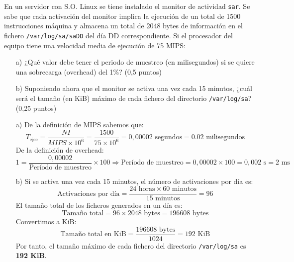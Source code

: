 \documentclass[a4paper,12pt]{article}
\begin{document}
\begin{tcolorbox}[colback=gray!10, colframe=black, title=3.- (0.75 puntos)]
En un servidor con S.O. Linux se tiene instalado el monitor de actividad \texttt{sar}. Se sabe que cada activación del monitor implica la ejecución de un total de 1500 instrucciones máquina y almacena un total de 2048 bytes de información en el fichero \texttt{/var/log/sa/saDD} del día DD correspondiente. Si el procesador del equipo tiene una velocidad media de ejecución de 75 MIPS:

\begin{enumerate}
    \item[a)] ¿Qué valor debe tener el periodo de muestreo (en milisegundos) si se quiere una sobrecarga (overhead) del 1\%? (0,5 puntos)
    \item[b)] Suponiendo ahora que el monitor se activa una vez cada 15 minutos, ¿cuál será el tamaño (en KiB) máximo de cada fichero del directorio \texttt{/var/log/sa}? (0,25 puntos)
\end{enumerate}
\end{tcolorbox}


\begin{itemize}
    \item [a)] De la definición de MIPS sabemos que:
    $$
    T_{\text{ejec}} = \frac{NI}{MIPS \times 10^{6}}  = \frac{1500}{75 \times 10^{6}} = 0,00002 \text{ segundos} = 0.02 \text{ milisegundos}
    $$
    De la definición de overhead:
    $$
    1 = \frac{0,00002}{\text{Período de muestreo}} \times 100 \Rightarrow \text{Período de muestreo} = 0,00002 \times 100 = 0,002 \text{ s} = 2 \text{ ms}
    $$
    \item [b)] Si se activa una vez cada 15 minutos, el número de activaciones por día es:
    $$
    \text{Activaciones por día} = \frac{24 \text{ horas} \times 60 \text{ minutos}}{15 \text{ minutos}} = 96
    $$
    El tamaño total de los ficheros generados en un día es:
    $$
    \text{Tamaño total} = 96 \times 2048 \text{ bytes} = 196608 \text{ bytes}
    $$
    Convertimos a KiB:
    $$
    \text{Tamaño total en KiB} = \frac{196608 \text{ bytes}}{1024} = 192 \text{ KiB}
    $$
    Por tanto, el tamaño máximo de cada fichero del directorio \texttt{/var/log/sa} es \textbf{192 KiB}.
\end{itemize}


\end{document}
